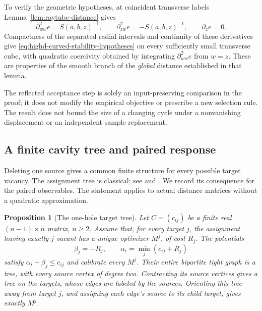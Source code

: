 \documentclass[11pt,reqno]{amsart}
\newtheorem{proposition}[theorem]{Proposition}
\theoremstyle{definition}
\theoremstyle{remark}
\numberwithin{equation}{section}
\begin{document}
To verify the geometric hypotheses, at coincident transverse
labels Lemma~\ref{lem:raytube-distance} gives
\[
 \partial_{ww}^2 e=S(a,b,z)^{-1},\qquad
 \partial_{zw}^2 e=-S(a,b,z)^{-1},\qquad \partial_z e=0.
\]
Compactness of the separated radial intervals and continuity of
these derivatives give
\eqref{eq:highd-curved-stability-hypotheses} on every sufficiently
small transverse cube, with quadratic coercivity obtained by
integrating \(\partial_{ww}^2e\) from \(w=z\).
These are properties of the smooth branch of the \emph{global}
distance established in that lemma.

The reflected acceptance step is solely an input-preserving
comparison in the proof; it does not modify the empirical objective
or prescribe a new selection rule. The result does not bound the
size of a changing cycle under a nonvanishing displacement or an
independent sample replacement.


\subsection{A finite cavity tree and paired response}
\label{subsec:highd-cavity-tree}

Deleting one source gives a common finite structure for every possible
target vacancy. The assignment tree is classical; see
\cite[proof of Theorem~5.3 and Corollary~5.4]{RichterGebertSturmfelsTheobald}
and \cite[Corollary~3.6 and Theorem~3.8]{CaraccioloSicuroSportiello}.
We record its consequence for the paired observables. The statement
applies to actual distance matrices without a quadratic approximation.

\begin{proposition}[The one-hole target tree]
\label{prop:highd-cavity-tree}
Let \(C=(c_{ij})\) be a finite real \((n-1)\times n\) matrix,
\(n\ge2\). Assume that, for every target \(j\), the assignment
leaving exactly \(j\) vacant has a unique optimizer \(M^j\), of
cost \(R_j\). The potentials
\[
 \beta_j=-R_j,\qquad \alpha_i=\min_j(c_{ij}+R_j)
\]
satisfy \(\alpha_i+\beta_j\le c_{ij}\) and calibrate every
\(M^j\). Their entire bipartite tight graph is a tree, with every
source vertex of degree two. Contracting its source vertices gives
a tree on the targets, whose edges are labeled by the sources.
Orienting this tree away from target \(j\), and assigning each
edge's source to its child target, gives exactly \(M^j\).
\end{proposition}
\end{document}
